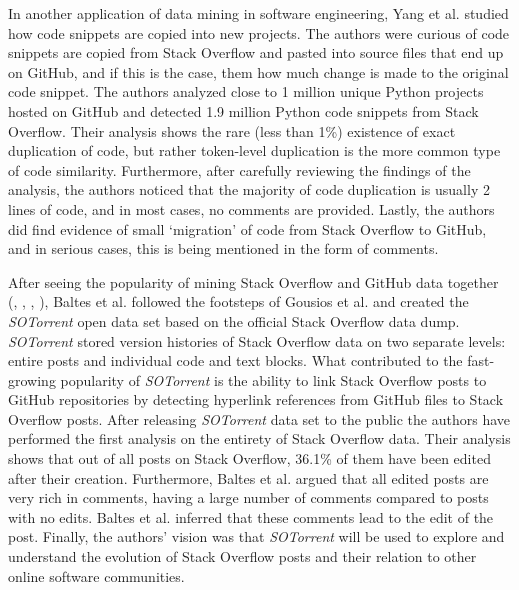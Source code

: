        In another application of data mining in software engineering, Yang et al. \cite{yang2017stack} studied how code snippets are copied into new projects. The authors were curious of code snippets are copied from Stack Overflow and pasted into source files that end up on GitHub, and if this is the case, them how much change is made to the original code snippet. The authors analyzed close to 1 million unique Python projects hosted on GitHub and detected 1.9 million Python code snippets from Stack Overflow. Their analysis shows the rare (less than 1\%) existence of exact duplication of code, but rather token-level duplication is the more common type of code similarity. Furthermore, after carefully reviewing the findings of the analysis, the authors noticed that the majority of code duplication is usually 2 lines of code, and in most cases, no comments are provided. Lastly, the authors did find evidence of small `migration' of code from Stack Overflow to GitHub, and in serious cases, this is being mentioned in the form of comments.
        
        After seeing the popularity of mining Stack Overflow and GitHub data together (\cite{vasilescu2013stackoverflow}, \cite{lee2017github}, \cite{badashian2014involvement}, \cite{yang2017stack}), Baltes et al. \cite{baltes2018sotorrent} followed the footsteps of Gousios et al. \cite{gousios2013ghtorent} and created the \emph{SOTorrent} open data set based on the official Stack Overflow data dump. \emph{SOTorrent} stored version histories of Stack Overflow data on two separate levels: entire posts and individual code and text blocks. What contributed to the fast-growing popularity of \emph{SOTorrent} is the ability to link Stack Overflow posts to GitHub repositories by detecting hyperlink references from GitHub files to Stack Overflow posts. After releasing \emph{SOTorrent} data set to the public the authors have performed the first analysis on the entirety of Stack Overflow data. Their analysis shows that out of all posts on Stack Overflow, 36.1\% of them have been edited after their creation. Furthermore, Baltes et al. argued that all edited posts are very rich in comments, having a large number of comments compared to posts with no edits. Baltes et al. inferred that these comments lead to the edit of the post.
        Finally, the authors' vision was that \emph{SOTorrent} will be used to explore and understand the evolution of Stack Overflow posts and their relation to other online software communities.
        
